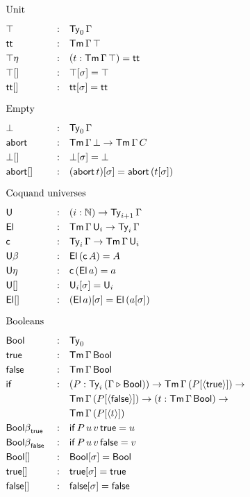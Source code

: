 \documentclass{article}
\begin{document}
\begin{multicols}{3}
\begin{alignat*}{5}
  & \heading{Unit} \\
  & \top && : && \Ty_0\,\Gamma \\
  & \tt && : && \Tm\,\Gamma\,\top \\
  & {\top\eta} && : && (t:\Tm\,\Gamma\,\top) = \tt \\
  & {\top[]} && : && \top[\sigma] = \top \\
  & {\tt[]} && : && \tt[\sigma] = \tt \\
  & \heading{Empty} \\
  & \bot && : && \Ty_0\,\Gamma \\
  & \abort && : && \Tm\,\Gamma\,\bot\ra\Tm\,\Gamma\,C \\
  & {\bot[]} && : && \bot[\sigma] = \bot \\
  & {\abort[]} && : && (\abort\,t)[\sigma] = \abort\,(t[\sigma]) \\
  & \heading{Coquand universes} \\
  & \U && : && (i:\N)\ra\Ty_{i+1}\,\Gamma \\
  & \El && : && \Tm\,\Gamma\,\U_i \ra \Ty_i\,\Gamma \\
  & \c && : && \Ty_i\,\Gamma\ra\Tm\,\Gamma\,\U_i \\
  & {\U\beta} && : && \El\,(\c\,A) = A \\
  & {\U\eta} && : && \c\,(\El\,a) = a \\
  & {\U[]} && : && \U_i[\sigma] = \U_i \\
  & {\El[]} && : && (\El\,a)[\sigma] = \El\,(a[\sigma]) \\
  & \heading{Booleans} \\
  & \Bool && : && \Ty_0 \\
  & \true && : && \Tm\,\Gamma\,\Bool \\
  & \false && : && \Tm\,\Gamma\,\Bool \\
  & \IF && : && (P:\Ty_i\,(\Gamma\ext\Bool))\ra\Tm\,\Gamma\,(P[\lb\true\rb])\ra \\
  & && && \Tm\,\Gamma\,(P[\lb\false\rb])\ra(t:\Tm\,\Gamma\,\Bool)\ra \\
  & && && \Tm\,\Gamma\,(P[\lb t\rb]) \\
  & {\Bool\beta}_\true && : && \IF\,P\,u\,v\,\true = u \\
  & {\Bool\beta}_\false && : && \IF\,P\,u\,v\,\false = v \\
  & {\Bool[]} && : && \Bool[\sigma] = \Bool \\
  & {\true[]} && : && \true[\sigma] = \true \\
  & {\false[]} && : && \false[\sigma] = \false \\

\end{alignat*}
\end{multicols}
\end{document}
